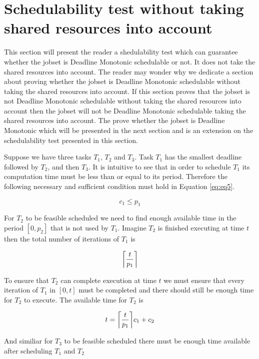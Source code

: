 \documentclass[10pt]{article}
\DeclarePairedDelimiter\ceil{\lceil}{\rceil}
\begin{document}
\section{Schedulability test without taking shared resources into account}

This section will present the reader a shedulability test which can guarantee whether the jobset is Deadline Monotonic schedulable or not.
It does not take the shared resources into account.
The reader may wonder why we dedicate a section about proving whether the jobset is Deadline Monotonic schedulable without taking the shared resources into account.
If this section proves that the jobset is not Deadline Monotonic schedulable without taking the shared resources into account then the jobset will not be Deadline Monotonic schedulable taking the shared resources into account.
The prove whether the jobset is Deadline Monotonic which will be presented in the next section and is an extension on the schedulability test presented in this section.
\newpage

Suppose we have three tasks $T_1$, $T_2$ and $T_3$. Task $T_1$ has the smallest deadline followed by $T_2$, and then $T_3$.
It is intuitive to see that in order to schedule $T_1$ its computation time must be less than or equal to its period.
Therefore the following necessary and sufficient condition must hold in Equation \ref{eq:eq5}.

\begin{equation}
    c_1 \leq p_1 
    \label{eq:eq5}
\end{equation}

For $T_2$ to be feasible scheduled we need to find enough available time in the period $[0, p_2]$ that is not used by $T_1$.
Imagine $T_2$ is finished executing at time $t$ then the total number of iterations of $T_1$ is

\begin{equation}
    \ceil*{\frac{t}{p_1}}
\end{equation}

To ensure that $T_2$ can complete execution at time $t$ we must ensure that every iteration of $T_1$ in $[0, t]$ must be completed and there should still be enough time for $T_2$ to execute.
The available time for $T_2$ is

\begin{equation}
    t = \ceil*{\frac{t}{p_1}}c_1 + c_2
\end{equation}

And similiar for $T_3$ to be feasible scheduled there must be enough time available after scheduling $T_1$ and $T_2$
\end{document}
